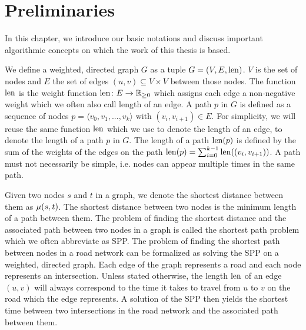 
\chapter{Preliminaries\label{ch:preliminaries}}
In this chapter, we introduce our basic notations and discuss important algorithmic concepts on which the work of this thesis is based.

We define a weighted, directed graph $G$ as a tuple $G=(V,E,\operatorname{len})$. $V$ is the set of nodes and $E$ the set of edges $(u,v) \subseteq V \times V$ between those nodes. The function $\operatorname{len}$ is the weight function $\operatorname{len}\colon E \rightarrow \mathbb{R}_{\ge 0}$ which assigns each edge a non-negative weight which we often also call length of an edge. A path $p$ in $G$ is defined as a sequence of nodes $p = \langle v_0,v_1,...,v_k \rangle$ with $(v_i,v_{i+1}) \in E$. For simplicity, we will reuse the same function $\operatorname{len}$ which we use to denote the length of an edge, to denote the length of a path $p$ in $G$. The length of a path $\operatorname{len}(p)$ is defined by the sum of the weights of the edges on the path $\operatorname{len}(p) = \sum_{i=0}^{k-1}{\operatorname{len}((v_i,v_{i+1}))}$. A path must not necessarily be simple, i.e. nodes can appear multiple times in the same path.

Given two nodes $s$ and $t$ in a graph, we denote the shortest distance between them as $\mu(s,t)$. The shortest distance between two nodes is the minimum length of a path between them. The problem of finding the shortest distance and the associated path between two nodes in a graph is called the shortest path problem which we often abbreviate as SPP. The problem of finding the shortest path between nodes in a road network can be formalized as solving the SPP on a weighted, directed graph. Each edge of the graph represents a road and each node represents an intersection. Unless stated otherwise, the length $\operatorname{len}$ of an edge $(u,v)$ will always correspond to the time it takes to travel from $u$ to $v$ on the road which the edge represents. A solution of the SPP then yields the shortest time between two intersections in the road network and the associated path between them.

